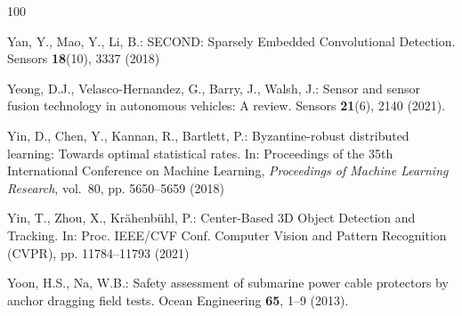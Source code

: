 \documentclass[graybox,envcountchap]{style/SNmono}
\begin{document}
\begin{thebibliography}{100}
{\par}
{\color{red} 
Yan, Y., Mao, Y., Li, B.: {SECOND: Sparsely Embedded Convolutional Detection}.
\newblock Sensors \textbf{18}(10), 3337 (2018)

\par}

Yeong, D.J., Velasco-Hernandez, G., Barry, J., Walsh, J.: Sensor and sensor
  fusion technology in autonomous vehicles: A review.
\newblock Sensors \textbf{21}(6), 2140 (2021).
\newblock {}


{\color{red} 
Yin, D., Chen, Y., Kannan, R., Bartlett, P.: Byzantine-robust distributed
  learning: Towards optimal statistical rates.
\newblock In: Proceedings of the 35th International Conference on Machine
  Learning, \emph{Proceedings of Machine Learning Research}, vol.~80, pp.
  5650--5659 (2018)

\par}
{\color{red} 
Yin, T., Zhou, X., Kr{\"a}henb{\"u}hl, P.: {Center-Based 3D Object Detection
  and Tracking}.
\newblock In: Proc. IEEE/CVF Conf. Computer Vision and Pattern Recognition
  (CVPR), pp. 11784--11793 (2021)

\par}

Yoon, H.S., Na, W.B.: Safety assessment of submarine power cable protectors by
  anchor dragging field tests.
\newblock Ocean Engineering \textbf{65}, 1--9 (2013).
\newblock {}



\end{thebibliography}
\end{document}
